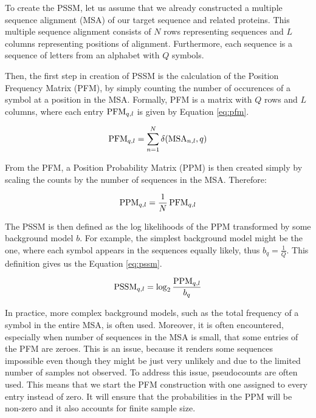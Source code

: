 To create the PSSM, let us assume that we already constructed a multiple sequence alignment (MSA) of our target sequence and related proteins.
This multiple sequence alignment consists of $N$ rows representing sequences and $L$ columns representing positions of alignment.
Furthermore, each sequence is a sequence of letters from an alphabet with $Q$ symbols.

Then, the first step in creation of PSSM is the calculation of the Position Frequency Matrix (PFM), by simply counting the number of occurences of a symbol at a position in the MSA.
Formally, PFM is a matrix with $Q$ rows and $L$ columns, where each entry $\operatorname{PFM}_{q, l}$ is given by Equation \ref{eq:pfm}.

\begin{equation}
    \operatorname{PFM}_{q, l} = \sum_{n = 1}^{N} \delta(\operatorname{MSA}_{n, l}, q)
    \label{eq:pfm}
\end{equation}

From the PFM, a Position Probability Matrix (PPM) is then created simply by scaling the counts by the number of sequences in the MSA.
Therefore:

\begin{equation}
    \operatorname{PPM}_{q, l} = \frac{1}{N} \operatorname{PFM}_{q, l}
\end{equation}

The PSSM is then defined as the log likelihoods of the PPM transformed by some background model $b$.
For example, the simplest background model might be the one, where each symbol appears in the sequences equally likely, thus $b_q = \frac{1}{Q}$.
This definition gives us the Equation \ref{eq:pssm}.

\begin{equation}
    \operatorname{PSSM}_{q, l} = \log_2 \frac{\operatorname{PPM}_{q, l}}{b_q}
    \label{eq:pssm}
\end{equation}

In practice, more complex background models, such as the total frequency of a symbol in the entire MSA, is often used.
Moreover, it is often encountered, especially when number of sequences in the MSA is small, that some entries of the PFM are zeroes.
This is an issue, because it renders some sequences impossible even though they might be just very unlikely and due to the limited number of samples not observed.
To address this issue, pseudocounts are often used.
This means that we start the PFM construction with one assigned to every entry instead of zero.
It will ensure that the probabilities in the PPM will be non-zero and it also accounts for finite sample size.


